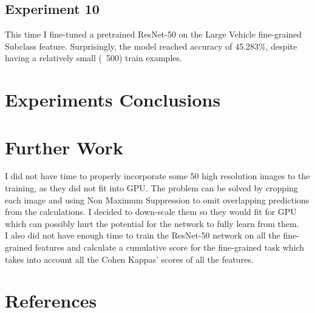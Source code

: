 \documentclass[]{article}
\begin{document}
\subsection{Experiment 10}
This time I fine-tuned a pretrained ResNet-50 on the Large Vehicle fine-grained Subclass feature. Surprisingly, the model reached accuracy of 45.283\%, despite having a relatively small (~500) train examples.

\section{Experiments Conclusions}

\section{Further Work}
I did not have time to properly incorporate some 50 high resolution images to the training, as they did not fit into GPU. The problem can be solved by cropping each image and using Non Maximum Suppression to omit overlapping predictions from the calculations. I decided to down-scale them so they would fit for GPU which can possibly hurt the potential for the network to fully learn from them.
\\
I also did not have enough time to train the ResNet-50 network on all the fine-grained features and calculate a cumulative score for the fine-grained task which takes into account all the Cohen Kappas' scores of all the features.

\section{References}
\end{document}
